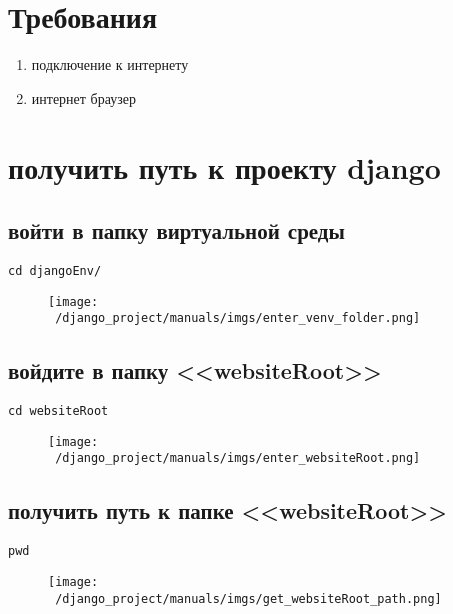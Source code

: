 \documentclass[12pt]{article}
\begin{document}
\tableofcontents
\newpage
\setcounter{page}{1}%
\section{Требования}
\begin{enumerate}
	\item подключение к интернету
  \item интернет браузер
\end{enumerate}
\section{получить путь к проекту django}
    \subsection{ войти в папку виртуальной среды}
			\begin{lstlisting}[caption=\phantom{},style=conlst,label={lst:enter_desktop}]
      cd djangoEnv/
			\end{lstlisting}
	\begin{figure}[H]
		\centering
		\texttt{[image: ~/django\_project/manuals/imgs/enter\_venv\_folder.png]}
		\caption{}
	\end{figure}
    \subsection{войдите в папку <<websiteRoot>>}
			\begin{lstlisting}[caption=\phantom{},style=conlst,label={lst:enter_desktop}]
      cd websiteRoot
			\end{lstlisting}
	\begin{figure}[H]
		\centering
		\texttt{[image: ~/django\_project/manuals/imgs/enter\_websiteRoot.png]}
		\caption{}
	\end{figure}
    \subsection{получить путь к папке <<websiteRoot>>}
			\begin{lstlisting}[caption=\phantom{},style=conlst,label={lst:enter_desktop}]
      pwd
			\end{lstlisting}
	\begin{figure}[H]
		\centering
		\texttt{[image: ~/django\_project/manuals/imgs/get\_websiteRoot\_path.png]}
		\caption{}
	\end{figure}
\end{document}
